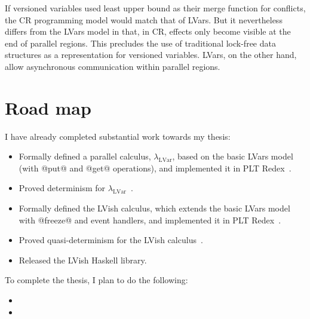 \documentclass{article}
\begin{document}
If versioned variables used least upper bound as their merge function
for conflicts, the CR programming model would match that of LVars.    But it nevertheless
differs from the LVars model in that, in CR, effects only become
visible at the end of parallel regions. 
This precludes the use of traditional lock-free data structures as a
representation for versioned variables.  LVars, on the other hand,
allow asynchronous communication within parallel regions.

\section{Road map}

I have already completed substantial work towards my thesis:

\begin{itemize}
  \item Formally defined a parallel calculus,
    $\lambda_{\textrm{LVar}}$, based on the basic LVars model (with
    @put@ and @get@ operations), and implemented it in PLT
    Redex~\cite{LVars-paper}.

  \item Proved determinism for
    $\lambda_{\textrm{LVar}}$~\cite{LVars-paper, LVars-TR}.

  \item Formally defined the LVish calculus, which extends the basic
    LVars model with @freeze@ and event handlers, and implemented it
    in PLT Redex~\cite{Freeze-paper}.

  \item Proved quasi-determinism for the LVish
    calculus~\cite{Freeze-paper, Freeze-TR}.

  \item Released the LVish Haskell library.
\end{itemize}
To complete the thesis, I plan to do the following:
\begin{itemize}
\item {}
\item {}
\end{itemize}



\end{document}
